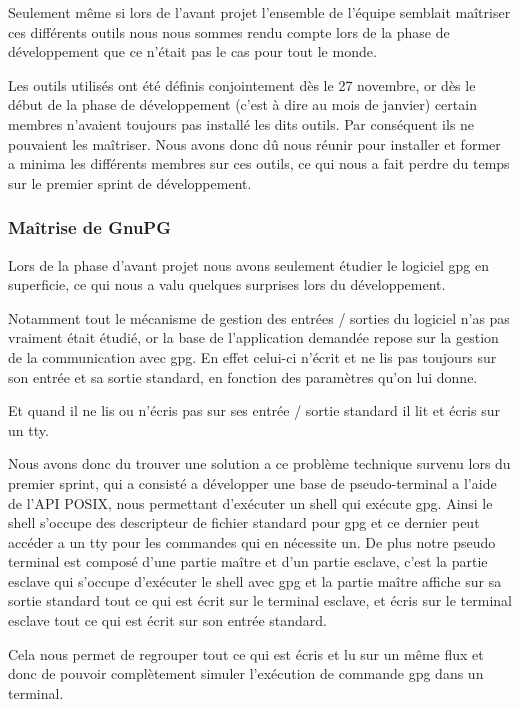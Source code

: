 \documentclass{../res/univ-projet}
\begin{document}
      Seulement même si lors de l'avant projet l'ensemble de l'équipe semblait maîtriser ces
      différents outils nous nous sommes rendu compte lors de la phase de développement que ce n'était pas le cas
      pour tout le monde.

      Les outils utilisés ont été définis conjointement dès le 27 novembre, or dès le début de la phase de développement
      (c'est à dire au mois de janvier) certain membres n'avaient toujours pas installé les dits outils. Par conséquent
      ils ne pouvaient les maîtriser. Nous avons donc dû nous réunir pour installer et former a minima les différents membres
      sur ces outils, ce qui nous a fait perdre du temps sur le premier sprint de développement.

    \subsubsection{Maîtrise de GnuPG}
    
      Lors de la phase d'avant projet nous avons seulement étudier le logiciel gpg
      en superficie, ce qui nous a valu quelques surprises lors du développement.

      Notamment tout le mécanisme de gestion des entrées / sorties du logiciel n'as pas vraiment était
      étudié, or la base de l'application demandée repose sur la gestion de la communication avec
      gpg.
      En effet celui-ci n'écrit et ne lis pas toujours sur son entrée et sa sortie standard,
      en fonction des paramètres qu'on lui donne.

      Et quand il ne lis ou n'écris pas sur ses entrée / sortie standard il lit et écris sur un
      tty.

      Nous avons donc du trouver une solution a ce problème technique survenu lors du premier sprint,
      qui a consisté a développer une base de pseudo-terminal a l'aide de l'API POSIX, nous permettant
      d'exécuter un shell qui exécute gpg.
      Ainsi le shell s'occupe des descripteur de fichier standard pour gpg et ce dernier peut accéder a un tty
      pour les commandes qui en nécessite un.
      De plus notre pseudo terminal est composé d'une partie maître et d'un partie esclave,
      c'est la partie esclave qui s'occupe d'exécuter le shell avec gpg et la partie maître affiche
      sur sa sortie standard tout ce qui est écrit sur le terminal esclave, 
      et écris sur le terminal esclave tout ce qui est écrit sur son entrée standard.

      Cela nous permet de regrouper tout ce qui est écris et lu sur un même flux et donc de pouvoir
      complètement simuler l'exécution de commande gpg dans un terminal.
  
\end{document}
